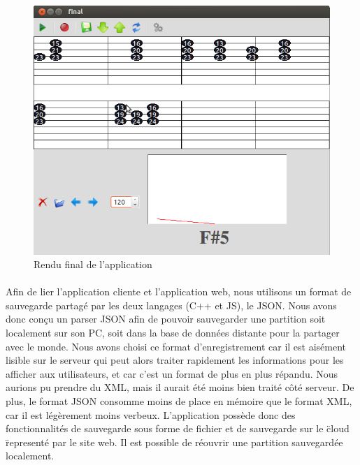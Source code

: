 \begin{figure}[H]
\centering
\includegraphics[scale=0.5]{RenduFinal}
\caption{Rendu final de l'application}
\end{figure}



\paragraph{}
Afin de lier l'application cliente et l'application web, nous utilisons un format de sauvegarde partagé par les deux 
langages (C++ et JS), le JSON. Nous avons donc conçu un parser JSON afin de pouvoir sauvegarder une partition 
soit localement sur son PC, soit dans la base de données distante pour la partager avec le monde. Nous avons choisi 
ce format d'enregistrement car il est aisément lisible sur le serveur qui peut alors traiter rapidement les informations 
pour les afficher aux utilisateurs, et car c'est un format de plus en plus répandu. Nous aurions pu prendre du XML, mais 
il aurait été moins bien traité côté serveur. De plus, le format JSON consomme moins de place en mémoire que le format XML,
car il est légèrement moins verbeux. L'application possède donc des fonctionnalités de sauvegarde sous forme de fichier et 
de sauvegarde sur le \" cloud \"  representé par le site web. Il est possible de réouvrir une partition sauvegardée localement.

